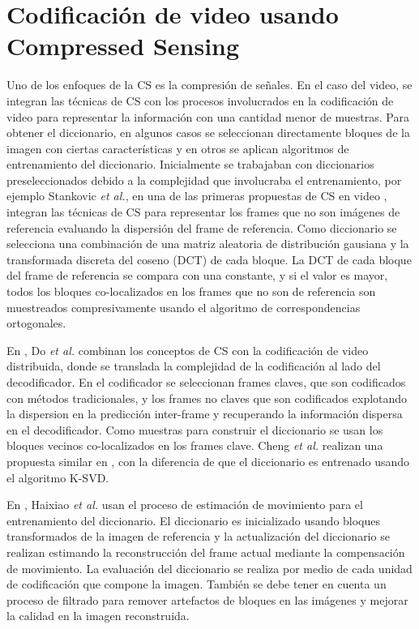 \section{Codificaci\'on de video usando Compressed Sensing}
\label{sec:codificacion_dispersa}
Uno de los enfoques de la CS es la compresi\'on de se\~nales. En el caso del video, se integran las t\'ecnicas de CS con los procesos involucrados en la codificaci\'on de video para representar la informaci\'on con una cantidad menor de muestras. Para obtener el diccionario, en algunos casos se seleccionan directamente bloques de la imagen con ciertas caracter\'isticas  y en otros se aplican algoritmos de entrenamiento del diccionario. Inicialmente se trabajaban con diccionarios preseleccionados debido a la complejidad que involucraba el entrenamiento, por ejemplo  Stankovic \textit{et al.}, en una de las primeras propuestas de CS en video \cite{stankovic2008compressive}, integran las t\'ecnicas de CS para representar los frames que no son im\'agenes de referencia evaluando la dispersi\'on del frame de referencia. Como diccionario se selecciona una combinaci\'on de una matriz aleatoria de distribuci\'on gausiana y la transformada discreta del coseno (DCT) de cada bloque. La DCT de cada bloque del frame de referencia se compara con una constante, y si el valor es mayor, todos los bloques co-localizados en los frames que no son de referencia son muestreados compresivamente usando el algoritmo de correspondencias ortogonales.  

En \cite{do2009distributed}, Do \textit{et al.} combinan los conceptos de CS con la codificaci\'on de video distribuida, donde se translada la complejidad de la codificaci\'on al lado del decodificador. En el codificador se seleccionan frames claves, que son codificados con m\'etodos tradicionales, y los frames no claves que son codificados explotando la dispersion en la predicci\'on inter-frame y recuperando la informaci\'on dispersa en el decodificador. Como muestras para construir el diccionario se usan los bloques vecinos co-localizados en los frames clave. Cheng \textit{et al.} realizan una propuesta similar en \cite{chen2010dictionary}, con la diferencia de que el diccionario es entrenado usando el algoritmo K-SVD. 

En \cite{haixiao_dictionary_2011}, Haixiao \textit{et al.} usan el proceso de estimaci\'on de movimiento para el entrenamiento del diccionario. El diccionario es inicializado usando bloques transformados de la imagen de referencia y la actualizaci\'on del diccionario se realizan estimando la reconstrucci\'on del frame actual mediante la compensaci\'on de movimiento. La evaluaci\'on del diccionario se realiza por medio de cada unidad de codificaci\'on que compone la imagen. Tambi\'en
se debe tener en cuenta un proceso de filtrado para remover artefactos de bloques en las im\'agenes y mejorar la calidad en la imagen reconstruida.

